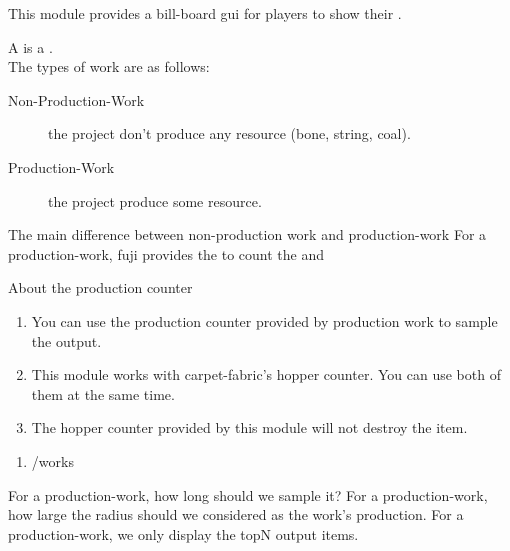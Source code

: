 
This module provides a bill-board gui for players to show their .

A  is a . \\
The types of work are as follows:
\begin{description}
    \item [Non-Production-Work] the project don't produce any resource (\eg bone, string, coal).
    \item[Production-Work] the project produce some resource.
\end{description}

\begin{note}{The main difference between non-production work and production-work}
    For a production-work, fuji provides the  to count the  and 
\end{note}

\begin{tips}{About the production counter}
    \begin{enumerate}
        \item You can use the production counter provided by production work to sample the output.
        \item {This module works with carpet-fabric's hopper counter. You can use both of them at the same time.}
        \item The hopper counter provided by this module will not destroy the item.
    \end{enumerate}

\end{tips}

\begin{enumerate}
    \item /works
\end{enumerate}

For a production-work, how long should we sample it?
For a production-work, how large the radius should we considered as the work's production.
For a production-work, we only display the topN output items.








